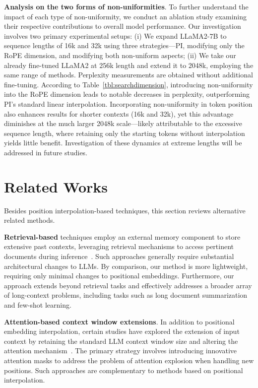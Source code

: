 \textbf{Analysis on the two forms of non-uniformities}. To further understand the impact of each type of non-uniformity, we conduct an ablation study examining their respective contributions to overall model performance. Our investigation involves two primary experimental setups: (i) We expand LLaMA2-7B to sequence lengths of 16k and 32k using three strategies—PI, modifying only the RoPE dimension, and modifying both non-uniform aspects; (ii) We take our already fine-tuned LLaMA2 at 256k length and extend it to 2048k, employing the same range of methods. Perplexity measurements are obtained without additional fine-tuning. According to Table~\ref{tbl:searchdimension}, introducing non-uniformity into the RoPE dimension leads to notable decreases in perplexity, outperforming PI’s standard linear interpolation. Incorporating non-uniformity in token position also enhances results for shorter contexts (16k and 32k), yet this advantage diminishes at the much larger 2048k scale—likely attributable to the excessive sequence length, where retaining only the starting tokens without interpolation yields little benefit. Investigation of these dynamics at extreme lengths will be addressed in future studies.

\section{Related Works}

Besides position interpolation-based techniques, this section reviews alternative related methods.

\textbf{Retrieval-based} techniques employ an external memory component to store extensive past contexts, leveraging retrieval mechanisms to access pertinent documents during inference~\cite{longllama,wang2023augmenting,borgeaud2022improving}. Such approaches generally require substantial architectural changes to LLMs. By comparison, our method is more lightweight, requiring only minimal changes to positional embeddings. Furthermore, our approach extends beyond retrieval tasks and effectively addresses a broader array of long-context problems, including tasks such as long document summarization and few-shot learning.

\textbf{Attention-based context window extensions}. In addition to positional embedding interpolation, certain studies have explored the extension of input context by retaining the standard LLM context window size and altering the attention mechanism~\cite{han2023lminfinite, streamingllm,parallelwindow}. The primary strategy involves introducing innovative attention masks to address the problem of attention explosion when handling new positions. Such approaches are complementary to methods based on positional interpolation.

